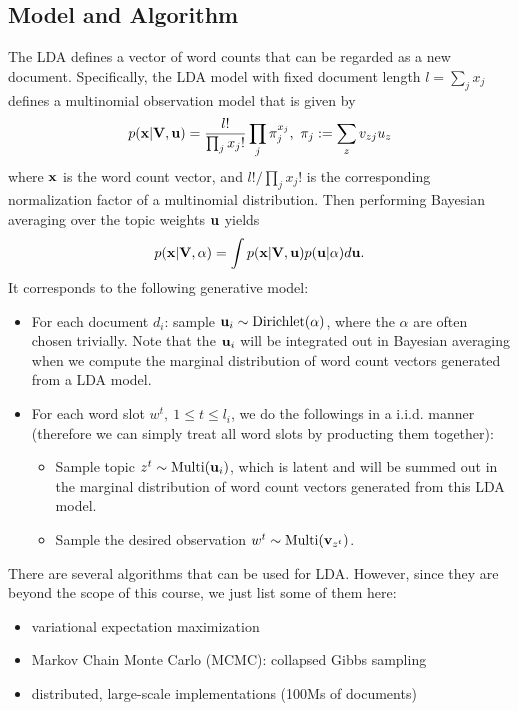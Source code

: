 \documentclass[../book-template.tex]{subfiles}
\begin{document}
\subsection{Model and Algorithm}
The LDA defines a vector of word counts that can be regarded as a new document. Specifically, the LDA model with fixed document length $l=\sum_j x_j$ defines a multinomial observation model that is given by
\begin{equation*}
p({\bf x}|{\bf V, u})=\frac{l!}{\prod_j x_j!}\prod_j \pi_j^{x_j},\ \pi_j := \sum_z v_{zj}u_z
\end{equation*}
where ${\bf x}$ is the word count vector, and $l!/\prod_j x_j!$ is the corresponding normalization factor of a multinomial distribution. Then performing Bayesian averaging over the topic weights ${\bf u}$ yields
\begin{equation*}
	p({\bf x}|{\bf V}, \alpha) = \int p({\bf x}|{\bf V, u}) p({\bf u}|\alpha)d{\bf u}.
\end{equation*}
It corresponds to the following generative model:
\begin{itemize}
	\item For each document $d_i$: sample ${\bf u}_i\sim \text{Dirichlet}(\alpha)$, where the $\alpha$ are often chosen trivially. Note that the ${\bf u}_i$ will be integrated out in Bayesian averaging when we compute the marginal distribution of word count vectors generated from a LDA model.
	\item For each word slot $w^t,\ 1\leq t\leq l_i$, we do the followings in a i.i.d. manner (therefore we can simply treat all word slots by producting them together):
	\begin{itemize}
		\item Sample topic $z^t \sim \text{Multi}({\bf u}_i)$, which is latent and will be summed out in the marginal distribution of word count vectors generated from this LDA model.
		\item Sample the desired observation $w^t\sim \text{Multi}({\bf v}_{z^t})$.
	\end{itemize}
\end{itemize}
\par There are several algorithms that can be used for LDA. However, since they are beyond the scope of this course, we just list some of them here:
\begin{itemize}
	\item variational expectation maximization
	\item Markov Chain Monte Carlo (MCMC): collapsed Gibbs sampling
	\item distributed, large-scale implementations (100Ms of documents)
\end{itemize}
\end{document}
